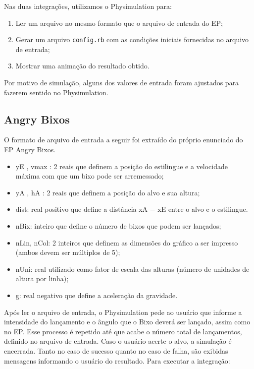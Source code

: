 Nas duas integrações, utilizamos o Physimulation para:

\begin{enumerate}
  \item Ler um arquivo no mesmo formato que o arquivo de entrada do EP;
  \item Gerar um arquivo {\tt config.rb} com as condições iniciais fornecidas no arquivo de entrada;
  \item Mostrar uma animação do resultado obtido.
\end{enumerate}

Por motivo de simulação, alguns dos valores de entrada foram ajustados para fazerem sentido no Physimulation.

\subsection{Angry Bixos}

O formato de arquivo de entrada a seguir foi extraído do próprio enunciado do EP Angry Bixos.

\begin{itemize}
  \item yE , vmax : 2 reais que definem a posição do estilingue e a velocidade máxima com que um bixo pode ser arremessado;
  \item yA , hA : 2 reais que definem a posição do alvo e sua altura;
  \item dist: real positivo que define a distância xA − xE entre o alvo e o estilingue.
  \item nBix: inteiro que define o número de bixos que podem ser lançados;
  \item nLin, nCol: 2 inteiros que definem as dimensões do gráfico a ser impresso (ambos devem ser múltiplos de 5);
  \item nUni: real utilizado como fator de escala das alturas (número de unidades de altura por linha);
  \item g: real negativo que define a aceleração da gravidade.
\end{itemize}

Após ler o arquivo de entrada, o Physimulation pede ao usuário que informe a intensidade do lançamento e o ângulo que o Bixo deverá ser lançado, assim como no EP. Esse processo é repetido até que acabe o número total de lançamentos, definido no arquivo de entrada. Caso o usuário acerte o alvo, a simulação é encerrada. Tanto no caso de sucesso quanto no caso de falha, são exibidas mensagens informando o usuário do resultado. Para executar a integração:

